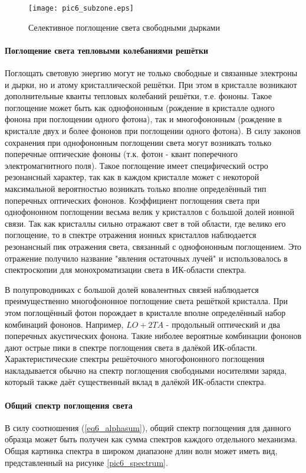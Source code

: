 \begin{figure}[h!]\centering
\texttt{[image: pic6\_subzone.eps]}
\caption{Селективное поглощение света свободными дырками}
\label{pic6_subzone}
\end{figure}

\paragraph{Поглощение света тепловыми колебаниями решётки}
Поглощать световую энергию могут не только свободные и связанные электроны и дырки, но и атому кристаллической решётки. При этом в кристалле возникают дополнительные кванты тепловых колебаний решётки, т.е. фононы. Такое поглощение может быть как однофононным (рождение в кристалле одного фонона при поглощении одного фотона), так и многофононным (рождение в кристалле двух и более фононов при поглощении одного фотона). В силу законов сохранения при однофононным поглощении света могут возникать только поперечные оптические фононы (т.к. фотон - квант поперечного электромагнитного поля). Такое поглощение имеет специфический остро резонансный характер, так как в каждом кристалле может с некоторой максимальной вероятностью возникать только вполне определённый тип поперечных оптических фононов. Коэффициент поглощения света при однофононном поглощении весьма велик у кристаллов с большой долей ионной связи. Так как кристаллы сильно отражают свет в той области, где велико его поглощение, то в спектре отражения ионных кристаллов наблюдается резонансный пик отражения света, связанный с однофононным поглощением. Это отражение получило название "явления остаточных лучей" и использовалось в спектроскопии для монохроматизации света в ИК-области спектра.

В полупроводниках с большой долей ковалентных связей наблюдается преимущественно многофононное поглощение света решёткой кристалла. При этом поглощённый фотон порождает в кристалле вполне определённый набор комбинаций фононов. Например, $LO + 2 TA$ - продольный оптический и два поперечных акустических фонона. Такие ниболее вероятные комбинации фононов дают острые пики в спектре поглощения света в далёкой ИК-области. Характеристические спектры решёточного многофононного поглощения накладывается обычно на спектр поглощения свободными носителями заряда, который также даёт существенный вклад в далёкой ИК-области спектра.

\paragraph{Общий спектр поглощения света}
В силу соотношения (\ref{eq6_alphasum}), общий спектр поглощения для данного образца может быть получен как сумма спектров каждого отдельного механизма. Общая картинка спектра в широком диапазоне длин волн может иметь вид, представленный на рисунке \ref{pic6_spectrum}.


